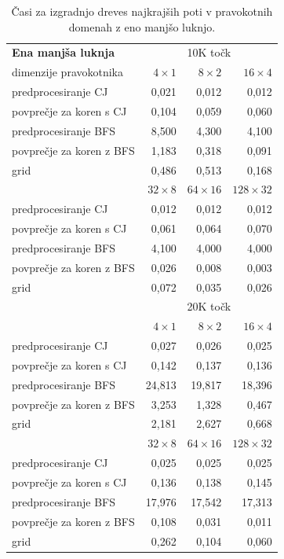 \documentclass[a4paper, 12pt]{book}
\begin{document}
\begin{table}[htp]
\begin{center}
\begin{tabular}{l*{3}{r}}
\textbf{Ena manjša luknja} & \multicolumn{3}{c}{10K točk}\\						
dimenzije pravokotnika	&	$4\times 1$	&	$8\times 2$	&	$16\times 4$		\\
\hline
predprocesiranje CJ	&	0,021	&	0,012	&	0,012		\\
povprečje za koren s CJ	&	0,104	&	0,059	&	0,060		\\
predprocesiranje BFS	&	8,500	&	4,300	&	4,100		\\
povprečje za koren z BFS	&	1,183	&	0,318	&	0,091		\\
grid	&	0,486	&	0,513	&	0,168  \vspace{.2cm}	\\
&	$32\times 8$	&	$64\times 16$	&	$128\times 32$ \\
predprocesiranje CJ &	0,012	&	0,012	&	0,012 \\
povprečje za koren s CJ &	0,061	&	0,064	&	0,070 \\
predprocesiranje BFS &	4,100	&	4,000	&	4,000 \\
povprečje za koren z BFS &	0,026	&	0,008	&	0,003 \\
grid &	0,072	&	0,035	&	0,026\vspace{.2cm} \\
\hline
  & \multicolumn{3}{c}{20K točk}\\
  &	$4\times 1$	&	$8\times 2$	&	$16\times 4$		\\  			
\hline
predprocesiranje CJ	&	0,027	&	0,026	&	0,025	\\
povprečje za koren s CJ	&	0,142	&	0,137	&	0,136	\\
predprocesiranje BFS	&	24,813	&	19,817	&	18,396	\\
povprečje za koren z BFS	&	3,253	&	1,328	&	0,467	\\
grid				&	2,181	&	2,627	&	0,668	\\
&	$32\times 8$	&	$64\times 16$	&	$128\times 32$ \\
predprocesiranje CJ &	0,025	&	0,025	&	0,025	\\
povprečje za koren s CJ &	0,136	&	0,138	&	0,145	\\
predprocesiranje BFS &	17,976	&	17,542	&	17,313	\\
povprečje za koren z BFS &	0,108	&	0,031	&	0,011	\\
grid &	0,262	&	0,104	&	0,060 
\end{tabular}
\caption{Časi za izgradnjo dreves najkrajših poti v pravokotnih domenah z eno manjšo luknjo.}
\label{table2}
\end{center}
\end{table}
\end{document}
